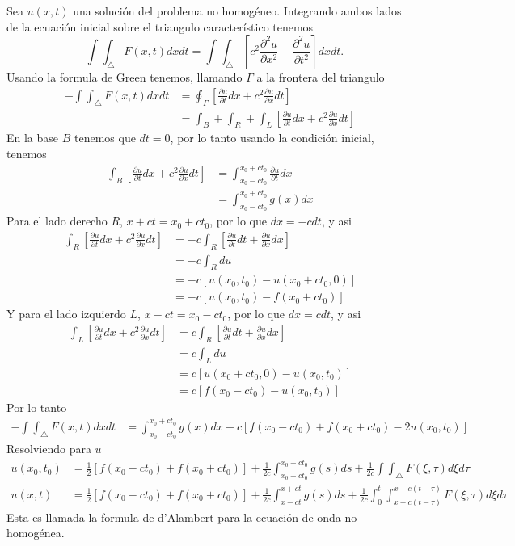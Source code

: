 \documentclass[11pt]{book}
\theoremstyle{plain}
\theoremstyle{definition}
\begin{document}
Sea $u(x,t)$ una solución del problema no homogéneo. Integrando ambos lados de la ecuación inicial sobre el triangulo característico tenemos 
\[
-\int\int_{\triangle}F(x,t)dxdt = \int\int _{\triangle} [c^2 \frac{\partial^2 u}{\partial x^2} - \frac{\partial^2 u}{\partial t^2}]dxdt
.\]
Usando la formula de Green tenemos, llamando $\Gamma$ a la frontera del triangulo
\begin{align*}
-\int\int_{\triangle}F(x,t)dxdt &= \oint _{\Gamma} [\frac{\partial u}{\partial t}dx + c^{2}\frac{\partial u}{\partial x}dt]\\
&= \int _{B} + \int _{R} + \int _{L} [\frac{\partial u}{\partial t}dx + c^{2}\frac{\partial u}{\partial x}dt]
\end{align*}
En la base $B$ tenemos que $dt = 0$, por lo tanto usando la condición inicial, tenemos
\begin{align*}
\int _{B} [\frac{\partial u}{\partial t}dx + c^{2}\frac{\partial u}{\partial x}dt] &=  \int_{x_0 -ct_0}^{x_0+ct_{0}} \frac{\partial u}{\partial t}dx\\
&= \int_{x_0 -ct_0}^{x_0+ct_{0}} g(x) dx
\end{align*}
Para el lado derecho $R$, $x+ct = x_0+ct_0$, por lo que $dx=-cdt$, y asi
\begin{align*}
\int _{R} [\frac{\partial u}{\partial t}dx + c^{2}\frac{\partial u}{\partial x}dt] &=  -c\int_{R}[\frac{\partial u}{\partial t}dt + \frac{\partial u}{\partial x}dx]\\
&= -c\int_{R} du\\
&= -c[u(x_0,t_0) - u(x_0+ct_0,0)]\\
&= -c[u(x_0,t_0)-f(x_0+ct_0)]
\end{align*}
Y para el lado izquierdo $L$, $x-ct = x_0-ct_0$, por lo que $dx=cdt$, y asi
\begin{align*}
\int _{L} [\frac{\partial u}{\partial t}dx + c^{2}\frac{\partial u}{\partial x}dt] &=  c\int_{R}[\frac{\partial u}{\partial t}dt + \frac{\partial u}{\partial x}dx]\\
&= c\int_{L} du\\
&= c[u(x_0+ct_0,0)-u(x_0,t_0)]\\
&= c[f(x_0-ct_0) - u(x_0,t_0)]
\end{align*}
Por lo tanto
\begin{align*}
-\int\int_{\triangle}F(x,t)dxdt &= \int_{x_0 -ct_0}^{x_0+ct_{0}} g(x) dx + c[f(x_0-ct_0) + f(x_0+ct_0) -2u(x_0,t_0)]
\end{align*}
Resolviendo para $u$
\begin{align*}
u(x_0,t_0) &= \frac{1}{2}[f(x_0-ct_0) + f(x_0+ct_0)] + \frac{1}{2c}\int_{x_0 -ct_0}^{x_0+ct_{0}} g(s) ds + \frac{1}{2c}\int\int_{\triangle}F(\xi,\tau)d\xi d\tau\\
u(x,t)&= \frac{1}{2}[f(x_0-ct_0) + f(x_0+ct_0)] + \frac{1}{2c}\int_{x -ct}^{x+ct} g(s) ds + \frac{1}{2c}\int_{0}^{t}\int_{x-c(t-\tau)}^{x+c(t-\tau)}F(\xi,\tau)d\xi d\tau
\end{align*}
Esta es llamada la formula de d'Alambert para la ecuación de onda no homogénea.
\end{document}
